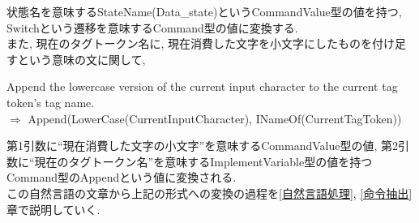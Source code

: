 \documentclass[uplatex,a4j]{jsreport}
\begin{document}
状態名を意味するStateName(Data_state)というCommandValue型の値を持つ, Switchという遷移を意味するCommand型の値に変換する.\\

また, 現在のタグトークン名に, 現在消費した文字を小文字にしたものを付け足すという意味の文に関して, 

Append the lowercase version of the current input character to the current tag token's tag name.\\
$\Rightarrow$ Append(LowerCase(CurrentInputCharacter), INameOf(CurrentTagToken))

第1引数に``現在消費した文字の小文字''を意味するCommandValue型の値, 第2引数に``現在のタグトークン名''を意味するImplementVariable型の値を持つCommand型のAppendという値に変換される.\\

この自然言語の文章から上記の形式への変換の過程を\ref{自然言語処理}, \ref{命令抽出}章で説明していく.\\
\end{document}
